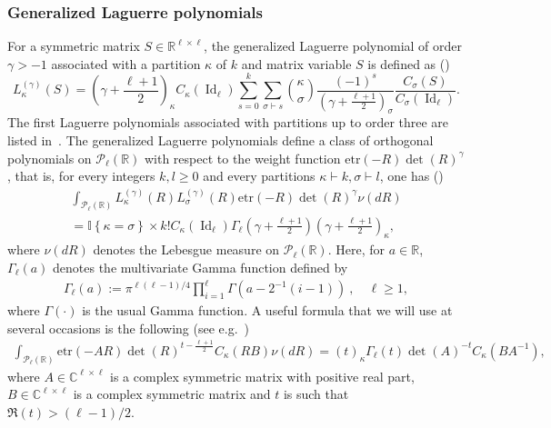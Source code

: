 \documentclass[AHL,Unicode,longabstracts,published]{cedram}
\DeclareMathOperator{\Id}{Id}
\newcommand{\clP}{\mathcal{P}}
\newcommand{\R}{\mathbb{R}}
\newcommand{\C}{\mathbb{C}}
\newcommand{\ind}[1]{\mathbb{I}
\left\{#1\right\}}
\newcommand{\etr}[1]{\mathrm{etr}\left(#1\right)}
\begin{document}
\subsubsection*{Generalized Laguerre polynomials}
For a symmetric matrix $S \in \R^{\ell \times \ell}$, the generalized Laguerre polynomial of order $\gamma>-1$ associated with a partition $\kappa$ of $k$ and matrix variable $S$ is defined as (\cite[Eq.~(4.6.5)]{BFZP})
\begin{equation}\label{LagZon}
L_{\kappa}^{(\gamma)}(S) = \left(\gamma+\frac{\ell+1}{2}\right)_{\kappa} C_{\kappa}(\Id_{\ell})
\sum_{s=0}^{k} \sum_{\sigma \vdash s} \binom{\kappa}{\sigma} \frac{(-1)^s}{\left(\gamma+\frac{\ell+1}{2}\right)_{\sigma}}\frac{C_{\sigma}(S)}{C_{\sigma}(\Id_{\ell})}.
\end{equation}
The first Laguerre polynomials associated with partitions up to order three are listed in~\cite[Eq.~(4.6.8)]{BFZP}. The generalized Laguerre polynomials define a class of orthogonal polynomials on $\clP_{\ell}(\R)$ with respect to the weight function $\etr{-R}\det(R)^{\gamma}$, that is, for every integers $k,l\geq0$ and every partitions $\kappa \vdash k, \sigma \vdash l$, one has (\cite[Theorem~4.6.4]{BFZP})
\begin{multline}\label{LagOrt}
\int_{\clP_{\ell}(\R)} L_{\kappa}^{(\gamma)}(R) L_{\sigma}^{(\gamma)}(R) \etr{-R}\det(R)^{\gamma} \nu(dR) \\
= \ind{\kappa=\sigma} \times k! C_{\kappa}(\Id_{\ell})
\Gamma_{\ell}\left(\gamma+\frac{\ell+1}{2}\right) \left(\gamma+\frac{\ell+1}{2}\right)_{\kappa},
\end{multline}
where $\nu(dR)$ denotes the Lebesgue measure on $\clP_{\ell}(\R)$. Here, for $a \in \R$, $\Gamma_{\ell}(a)$ denotes the multivariate Gamma function defined by
\begin{gather*}
\Gamma_{\ell}(a):= \pi^{\ell(\ell-1)/4} \prod_{i=1}^{\ell} \Gamma\left(a -2^{-1}(i-1)\right) \ , \quad \ell \geq 1,
\end{gather*}
where $\Gamma(\cdot)$ is the usual Gamma function. A useful formula that we will use at several occasions is the following (see e.g.~\cite[Theorem~4.4.1]{BFZP})
\begin{gather}\label{intzonal}
\int_{\clP_{\ell}(\R)}
\etr{-AR}\det(R)^{t-\frac{\ell+1}{2}}C_{\kappa}(RB) \nu(dR) = (t)_{\kappa} \Gamma_{\ell}(t) \det(A)^{-t}C_{\kappa}\left(BA^{-1}\right),
\end{gather}
where $A\in \C^{\ell \times \ell}$ is a complex symmetric matrix with positive real part, $B\in \C^{\ell \times \ell}$ is a complex symmetric matrix and $t$ is such that $\Re(t)>(\ell-1)/2$.
\end{document}
